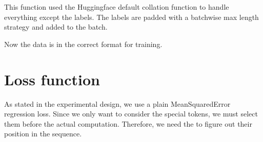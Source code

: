 \documentclass[letterpaper,10pt,english]{jupyterBook}
\begin{document}
\begin{sphinxVerbatimInput}
\begin{sphinxVerbatim}[commandchars=\\\{\}]
       \PYG{p}{[}\PYG{p}{]}
          
            \PYG{p}{[}\PYG{p}{[}\PYG{p}{]}    \PYG{p}{]}

        \PYG{p}{[}\PYG{p}{]}  
     
\end{sphinxVerbatim}
\end{sphinxVerbatimInput}

\sphinxAtStartPar
This function used the Huggingface default collation function to handle everything except the labels. The labels are padded with a batch\sphinxhyphen{}wise max length strategy and added to the batch.
\begin{sphinxVerbatimInput}

\begin{sphinxVerbatim}[commandchars=\\\{\}]
  \PYG{p}{[}\PYG{p}{]}  
  
\end{sphinxVerbatim}
\end{sphinxVerbatimInput}

\sphinxAtStartPar
Now the data is in the correct format for training.


\section{Loss function}
\label{\detokenize{Prerequisites:loss-function}}
\sphinxAtStartPar
As stated in the experimental design, we use a plain Mean\sphinxhyphen{}Squared\sphinxhyphen{}Error regression loss. Since we only want to consider the special tokens, we must select them before the actual computation. Therefore, we need the  to figure out their position in the sequence.
\end{document}
